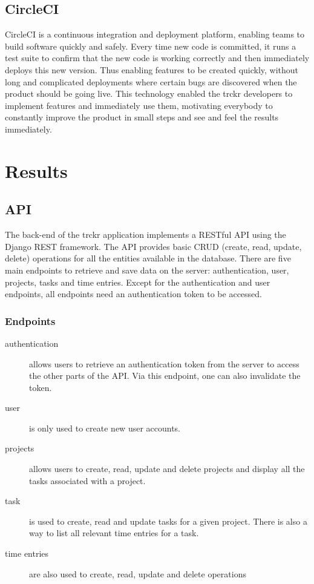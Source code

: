 \documentclass[bibliography=totoc, listof=totocnumbered]{scrartcl}
\begin{document}
\subsection{CircleCI}
CircleCI is a continuous integration and deployment platform, enabling teams to
build software quickly and safely.\cite{circleci} Every time new code is
committed, it runs a test suite to confirm that the new code is working
correctly and then immediately deploys this new version. Thus enabling features
to be created quickly, without long and complicated deployments where certain
bugs are discovered when the product should be going live. This technology
enabled the trckr developers to implement features and immediately use them,
motivating everybody to constantly improve the product in small steps and see
and feel the results immediately.

\section{Results}

\subsection{API}
The back-end of the trckr application implements a RESTful API using the Django
REST framework. The API provides basic CRUD (create, read, update, delete)
operations for all the entities available in the database. There are five main
endpoints to retrieve and save data on the server: authentication, user, 
projects, tasks and time entries. Except for the authentication and user
endpoints, all endpoints need an authentication token to be accessed.

\subsubsection{Endpoints}
\begin{description}
\item[authentication] allows users to retrieve an authentication token from the
  server to access the other parts of the API. Via this endpoint, one can also
  invalidate the token.
\item[user] is only used to create new user accounts.
\item[projects] allows users to create, read, update and delete projects and
  display all the tasks associated with a project.
\item[task] is used to create, read and update tasks for a given project. There
  is also a way to list all relevant time entries for a task.
\item[time entries] are also used to create, read, update and delete operations
\end{description}
\end{document}
